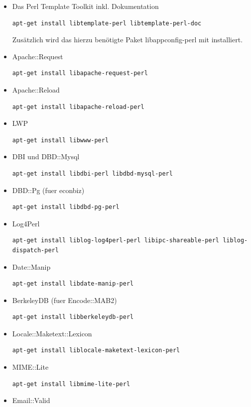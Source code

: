 \documentclass[11pt, twoside, a4paper, BCOR8mm, DIV12, bibtotoc,idxtotoc]{scrbook}
\begin{document}
\begin{itemize}
\item Das Perl Template Toolkit inkl. Dokumentation
\begin{verbatim}
apt-get install libtemplate-perl libtemplate-perl-doc
\end{verbatim}
  Zusätzlich wird das hierzu benötigte Paket libappconfig-perl mit
  installiert.
\item Apache::Request
\begin{verbatim}
apt-get install libapache-request-perl
\end{verbatim}
\item Apache::Reload
\begin{verbatim}
apt-get install libapache-reload-perl
\end{verbatim}
\item LWP
\begin{verbatim}
apt-get install libwww-perl
\end{verbatim}
\item DBI und DBD::Mysql
\begin{verbatim}
apt-get install libdbi-perl libdbd-mysql-perl
\end{verbatim}
\item DBD::Pg (fuer econbiz)
\begin{verbatim}
apt-get install libdbd-pg-perl
\end{verbatim}
\item Log4Perl
\begin{verbatim}
apt-get install liblog-log4perl-perl libipc-shareable-perl liblog-dispatch-perl
\end{verbatim}
\item Date::Manip
\begin{verbatim}
apt-get install libdate-manip-perl
\end{verbatim}
\item BerkeleyDB (fuer Encode::MAB2)
\begin{verbatim}
apt-get install libberkeleydb-perl
\end{verbatim}
\item Locale::Maketext::Lexicon
\begin{verbatim}
apt-get install liblocale-maketext-lexicon-perl
\end{verbatim}
\item MIME::Lite
\begin{verbatim}
apt-get install libmime-lite-perl
\end{verbatim}
\item Email::Valid

\end{itemize}
\end{document}
